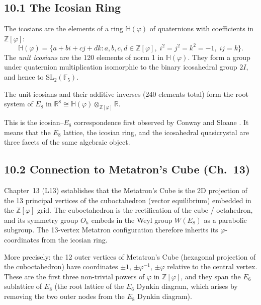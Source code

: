 \subsection{10.1 The Icosian Ring}\label{sec:icosian-ring}

The icosians are the elements of a ring
\(\mathbb{H}(\varphi)\) of quaternions with
coefficients in \(\mathbb{Z}[\varphi]\):
\[
  \mathbb{H}(\varphi) = \{a + bi + cj + dk :
    a, b, c, d \in \mathbb{Z}[\varphi],\;
    i^2 = j^2 = k^2 = -1,\; ij = k\}.
\]
The \emph{unit icosians} are the 120 elements of
norm 1 in \(\mathbb{H}(\varphi)\). They form a
group under quaternion multiplication isomorphic
to the binary icosahedral group \(2I\), and hence
to \(\mathrm{SL}_2(\mathbb{F}_5)\).

\begin{proposition}
\label{prop:icosian-e8}
The unit icosians and their additive inverses
(240 elements total) form the root system of
\(E_8\) in \(\mathbb{R}^8 \cong \mathbb{H}(\varphi)
\otimes_{\mathbb{Z}[\varphi]} \mathbb{R}\).
\end{proposition}

\noindent
This is the icosian--\(E_8\) correspondence
first observed by Conway and Sloane
\cite{conway1988sphere}. It means that the
\(E_8\) lattice, the icosian ring, and the
icosahedral quasicrystal are three facets of the
same algebraic object.

\subsection{10.2 Connection to Metatron's Cube
(Ch.~13)}\label{sec:icosian-metatron}

Chapter~13 (L13) establishes that the Metatron's
Cube is the 2D projection of the 13 principal
vertices of the cuboctahedron (vector equilibrium)
embedded in the \(\mathbb{Z}[\varphi]\) grid. The
cuboctahedron is the rectification of the cube /
octahedron, and its symmetry group \(O_h\) embeds
in the Weyl group \(W(E_8)\) as a parabolic
subgroup. The 13-vertex Metatron configuration
therefore inherits its \(\varphi\)-coordinates
from the icosian ring.

More precisely: the 12 outer vertices of
Metatron's Cube (hexagonal projection of the
cuboctahedron) have coordinates \(\pm 1\),
\(\pm\varphi^{-1}\), \(\pm\varphi\) relative to
the central vertex. These are the first three
non-trivial powers of \(\varphi\) in
\(\mathbb{Z}[\varphi]\), and they span the
\(E_6\) sublattice of \(E_8\) (the root lattice
of the \(E_6\) Dynkin diagram, which arises by
removing the two outer nodes from the \(E_8\)
Dynkin diagram).

